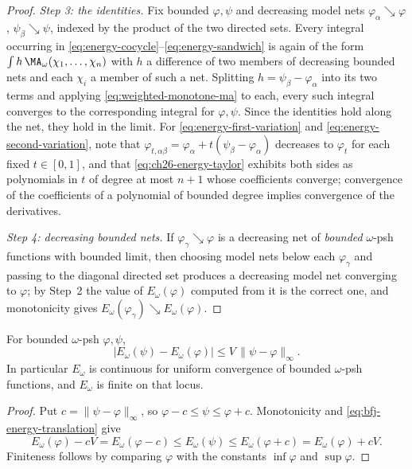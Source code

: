 \begin{proof}
\emph{Step 3: the identities.}  Fix bounded \(\varphi,\psi\) and decreasing
model nets \(\varphi_\alpha\searrow\varphi\),
\(\psi_\beta\searrow\psi\), indexed by the product of the two directed sets.
Every integral occurring in
\eqref{eq:energy-cocycle}--\eqref{eq:energy-sandwich} is again of the form
\(\int h\,\MA_\omega(\chi_1,\ldots,\chi_n)\) with \(h\) a difference of two
members of decreasing bounded nets and each \(\chi_i\) a member of such a
net.  Splitting \(h=\psi_\beta-\varphi_\alpha\) into its two terms and
applying \eqref{eq:weighted-monotone-ma} to each, every such integral
converges to the corresponding integral for \(\varphi,\psi\).  Since the
identities hold along the net, they hold in the limit.  For
\eqref{eq:energy-first-variation} and
\eqref{eq:energy-second-variation}, note that
\(\varphi_{t,\alpha\beta}=\varphi_\alpha+t(\psi_\beta-\varphi_\alpha)\)
decreases to \(\varphi_t\) for each fixed \(t\in[0,1]\), and that
\eqref{eq:ch26-energy-taylor} exhibits both sides as polynomials in \(t\) of
degree at most \(n+1\) whose coefficients converge; convergence of the
coefficients of a polynomial of bounded degree implies convergence of the
derivatives.

\emph{Step 4: decreasing bounded nets.}  If \(\varphi_\gamma\searrow\varphi\)
is a decreasing net of \emph{bounded} \(\omega\)-psh functions with bounded
limit, then choosing model nets below each \(\varphi_\gamma\) and passing to
the diagonal directed set produces a decreasing model net converging to
\(\varphi\); by Step~2 the value of \(E_\omega(\varphi)\) computed from it is
the correct one, and monotonicity gives
\(E_\omega(\varphi_\gamma)\searrow E_\omega(\varphi)\).
\end{proof}

\begin{proposition}
\label{prop:ch26-energy-lipschitz}
For bounded \(\omega\)-psh \(\varphi,\psi\),
\begin{equation}
\label{eq:ch26-energy-lipschitz}
 \bigl|E_\omega(\psi)-E_\omega(\varphi)\bigr|
 \leq V\,\lVert\psi-\varphi\rVert_\infty .
\end{equation}
In particular \(E_\omega\) is continuous for uniform convergence of bounded
\(\omega\)-psh functions, and \(E_\omega\) is finite on that locus.
\end{proposition}

\begin{proof}
Put \(c=\lVert\psi-\varphi\rVert_\infty\), so \(\varphi-c\leq\psi\leq\varphi+c\).
Monotonicity and \eqref{eq:bfj-energy-translation} give
\[
 E_\omega(\varphi)-cV=E_\omega(\varphi-c)
 \leq E_\omega(\psi)\leq E_\omega(\varphi+c)=E_\omega(\varphi)+cV .
\]
Finiteness follows by comparing \(\varphi\) with the constants
\(\inf\varphi\) and \(\sup\varphi\).
\end{proof}

